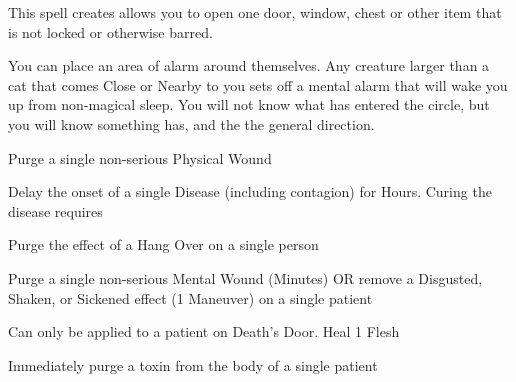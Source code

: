 {  

  This spell creates allows you to open one door, window, chest or other item that is not locked or otherwise barred. 


  You can place an area of alarm around themselves.  Any creature larger than a cat that comes Close or Nearby to you sets off a mental alarm that will wake you up from non-magical sleep.  You will not know what has entered the circle, but you will know something has, and the the general direction.



    \newpage




  
  \LEECHCRAFT[
    Name=Bonesetting,
    Link=leechcraft-bonesetting,
    Mod=+3,
    Length=Hours,
    Keywords=Purge
  ]
  Purge a single non-serious Physical Wound

  \LEECHCRAFT[
    Name=Delay Infection,
    Link=leechcraft-delay-infection,
    Mod=+3,
    Length=2 Maneuvers,
    Keywords=None 
  ]
  
  Delay the onset of a single Disease (including contagion) for Hours.  Curing the disease requires 

  \cbreak

  \LEECHCRAFT[
    Name=Hair of the Dog,
    Link=leechcraft-hair-of-the-dog,
    Mod=+9,
    Length=Minutes,
    Keywords=Purge 
  ]
  Purge the effect of a Hang Over on a single person

  \LEECHCRAFT[
    Name=Laudanum,
    Link=leechcraft-laudanum,
    Mod=+0,
    Length=see below,
    Keywords=Purge 
  ]
  Purge a single non-serious Mental Wound (Minutes) OR remove a Disgusted, Shaken, or Sickened effect (1 Maneuver) on a single patient

  \LEECHCRAFT[
    Name=Mend,
    Link=leechcraft-mend,
    Mod=+9,
    Length=1 Maneuver,
    Keywords=None 
  ]
  Can only be applied to a patient on Death's Door. Heal 1 Flesh

  \LEECHCRAFT[
    Name=Purge Toxin,
    Link=leechcraft-purge-toxin,
    Mod=+3,
    Length=1 Maneuver,
    Keywords=Purge 
  ]
  Immediately purge a toxin from the body of a single patient

}
